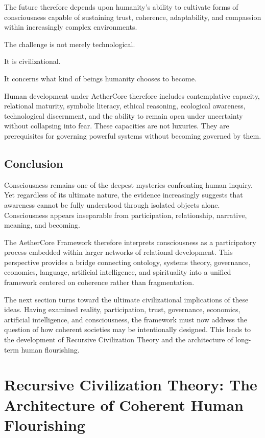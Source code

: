 \documentclass[12pt]{article}
\begin{document}
The future therefore depends upon humanity's ability to cultivate forms of consciousness capable of sustaining trust, coherence, adaptability, and compassion within increasingly complex environments.

The challenge is not merely technological.

It is civilizational.

It concerns what kind of beings humanity chooses to become.

Human development under AetherCore therefore includes contemplative capacity, relational maturity, symbolic literacy, ethical reasoning, ecological awareness, technological discernment, and the ability to remain open under uncertainty without collapsing into fear. These capacities are not luxuries. They are prerequisites for governing powerful systems without becoming governed by them.

\subsection{Conclusion}

Consciousness remains one of the deepest mysteries confronting human inquiry. Yet regardless of its ultimate nature, the evidence increasingly suggests that awareness cannot be fully understood through isolated objects alone. Consciousness appears inseparable from participation, relationship, narrative, meaning, and becoming.

The AetherCore Framework therefore interprets consciousness as a participatory process embedded within larger networks of relational development. This perspective provides a bridge connecting ontology, systems theory, governance, economics, language, artificial intelligence, and spirituality into a unified framework centered on coherence rather than fragmentation.

The next section turns toward the ultimate civilizational implications of these ideas. Having examined reality, participation, trust, governance, economics, artificial intelligence, and consciousness, the framework must now address the question of how coherent societies may be intentionally designed. This leads to the development of Recursive Civilization Theory and the architecture of long-term human flourishing.

\section{Recursive Civilization Theory: The Architecture of Coherent Human Flourishing}
\end{document}
